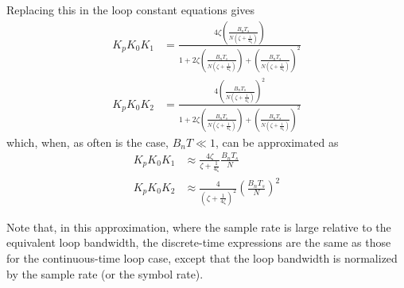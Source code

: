 Replacing this in the loop constant equations gives
\begin{align}
K_p K_0 K_1 &= \frac{4\zeta\left(\frac{B_n T_s}{N\left(\zeta+\frac{1}{4\zeta}\right)}\right)}{1+2\zeta\left(\frac{B_n T_s}{N\left(\zeta+\frac{1}{4\zeta}\right)}\right)+\left(\frac{B_n T_s}{N\left(\zeta+\frac{1}{4\zeta}\right)}\right)^2}\\
K_p K_0 K_2 &= \frac{4\left(\frac{B_n T_s}{N\left(\zeta+\frac{1}{4\zeta}\right)}\right)^2}{1+2\zeta\left(\frac{B_n T_s}{N\left(\zeta+\frac{1}{4\zeta}\right)}\right)+\left(\frac{B_n T_s}{N\left(\zeta+\frac{1}{4\zeta}\right)}\right)^2}
\end{align}
which, when, as often is the case, $B_nT\ll1$, can be approximated as
\begin{align}
\label{eq:digital_loop_constants1} K_p K_0 K_1 &\approx \frac{4\zeta}{\zeta+\frac{1}{4\zeta}}\frac{B_n T_s}{N}\\
\label{eq:digital_loop_constants2} K_p K_0 K_2 &\approx \frac{4}{\left(\zeta+\frac{1}{4\zeta}\right)^2}\left(\frac{B_n T_s}{N}\right)^2
\end{align}

Note that, in this approximation, where the sample rate is large relative to the equivalent loop bandwidth, the discrete-time expressions are the same as those for the continuous-time loop case, except that the loop bandwidth is normalized by the sample rate (or the symbol rate).

